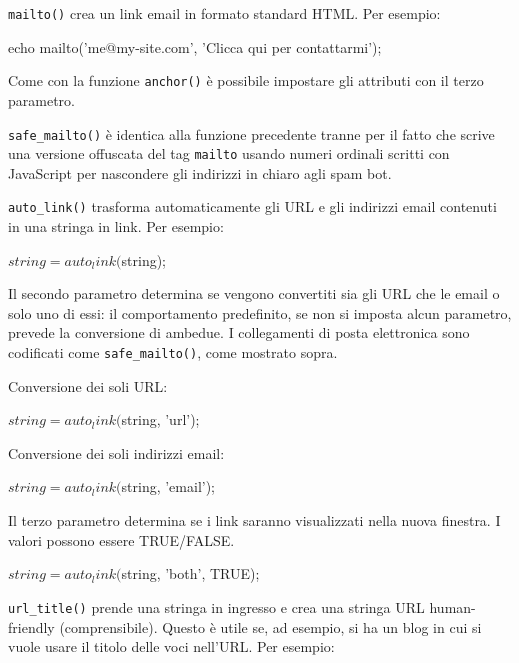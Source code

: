 \verb|mailto()| crea un link email in formato standard HTML. Per esempio:

\begin{code}
echo mailto('me@my-site.com', 'Clicca qui per contattarmi');
\end{code}

Come con la funzione \verb|anchor()| è possibile impostare gli attributi con il terzo parametro.

\verb|safe_mailto()| è identica alla funzione precedente tranne per il fatto che scrive una versione offuscata del tag \verb|mailto| usando numeri ordinali scritti con JavaScript per nascondere gli indirizzi in chiaro agli spam bot.

\verb|auto_link()| trasforma automaticamente gli URL e gli indirizzi email contenuti in una stringa in link. Per esempio:

\begin{code}
$string = auto_link($string);
\end{code}

Il secondo parametro determina se vengono convertiti sia gli URL che le email o solo uno di essi: il comportamento predefinito, se non si imposta alcun parametro, prevede la conversione di ambedue. I collegamenti di posta elettronica sono codificati come \verb|safe_mailto()|, come mostrato sopra. 

Conversione dei soli URL:

\begin{code}
$string = auto_link($string, 'url');
\end{code}

Conversione dei soli indirizzi email:

\begin{code}
$string = auto_link($string, 'email');
\end{code}

Il terzo parametro determina se i link saranno visualizzati nella nuova finestra. I valori possono essere TRUE/FALSE.

\begin{code}
$string = auto_link($string, 'both', TRUE);
\end{code}

\verb|url_title()| prende una stringa in ingresso e crea una stringa URL human-friendly (comprensibile). Questo è utile se, ad esempio, si ha un blog in cui si vuole usare il titolo delle voci nell'URL. Per esempio:


